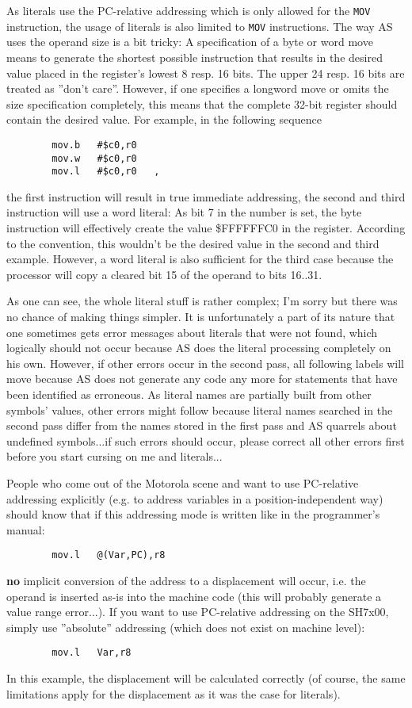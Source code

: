 \documentclass[12pt,twoside]{report}
\newcommand{\bb}[1]{{\bf #1}}
\newcommand{\tty}[1]{{\tt #1}}
\begin{document}
As literals use the PC-relative addressing which is only allowed for
the \tty{MOV} instruction, the usage of literals is also limited to
\tty{MOV} instructions.  The way AS uses the operand size is a bit tricky:
A specification of a byte or word move means to generate the shortest
possible instruction that results in the desired value placed in the
register's lowest 8 resp. 16 bits.  The upper 24 resp. 16 bits are treated
as ''don't care''.  However, if one specifies a longword move or omits the
size specification completely, this means that the complete 32-bit
register should contain the desired value.  For example, in the following
sequence
\begin{verbatim}
        mov.b   #$c0,r0
        mov.w   #$c0,r0
        mov.l   #$c0,r0   ,
\end{verbatim}
the first instruction will result in true immediate addressing, the
second and third instruction will use a word literal:  As bit 7 in
the number is set, the byte instruction will effectively create the
value \$FFFFFFC0 in the register.  According to the convention, this
wouldn't be the desired value in the second and third example. 
However, a word literal is also sufficient for the third case because
the processor will copy a cleared bit 15 of the operand to bits
16..31. 

As one can see, the whole literal stuff is rather complex; I'm sorry but
there was no chance of making things simpler.  It is unfortunately a
part of its nature that one sometimes gets error messages about
literals that were not found, which logically should not occur because
AS does the literal processing completely on his own.  However, if
other errors occur in the second pass, all following labels will move
because AS does not generate any code any more for statements that
have been identified as erroneous.  As literal names are partially built
from other symbols' values, other errors might follow because literal
names searched in the second pass differ from the names stored in the
first pass and AS quarrels about undefined symbols...if such errors
should occur, please correct all other errors first before you start
cursing on me and literals...

People who come out of the Motorola scene and want to use PC-relative
addressing explicitly (e.g. to address variables in a position-independent
way) should know that if this addressing mode is written like in the
programmer's manual:
\begin{verbatim}
        mov.l   @(Var,PC),r8
\end{verbatim}
\bb{no} implicit conversion of the address to a displacement will occur,
i.e. the operand is inserted as-is into the machine code (this will
probably generate a value range error...).  If you want to use
PC-relative addressing on the SH7x00, simply use ''absolute''
addressing (which does not exist on machine level):
\begin{verbatim}
        mov.l   Var,r8
\end{verbatim}
In this example, the displacement will be calculated correctly (of
course, the same limitations apply for the displacement as it was the
case for literals).
\end{document}
